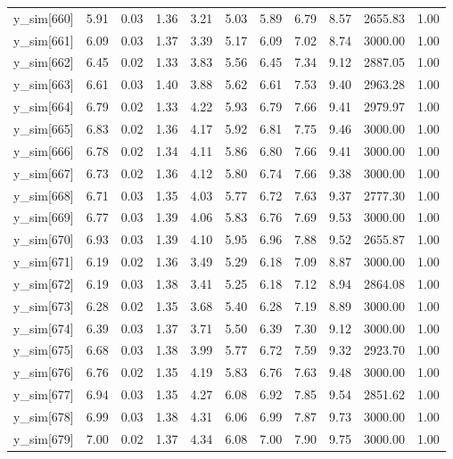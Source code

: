 \begin{table}[ht]
\begin{tabular}{rrrrrrrrrrr}
  y\_sim[660] & 5.91 & 0.03 & 1.36 & 3.21 & 5.03 & 5.89 & 6.79 & 8.57 & 2655.83 & 1.00 \\ 
  y\_sim[661] & 6.09 & 0.03 & 1.37 & 3.39 & 5.17 & 6.09 & 7.02 & 8.74 & 3000.00 & 1.00 \\ 
  y\_sim[662] & 6.45 & 0.02 & 1.33 & 3.83 & 5.56 & 6.45 & 7.34 & 9.12 & 2887.05 & 1.00 \\ 
  y\_sim[663] & 6.61 & 0.03 & 1.40 & 3.88 & 5.62 & 6.61 & 7.53 & 9.40 & 2963.28 & 1.00 \\ 
  y\_sim[664] & 6.79 & 0.02 & 1.33 & 4.22 & 5.93 & 6.79 & 7.66 & 9.41 & 2979.97 & 1.00 \\ 
  y\_sim[665] & 6.83 & 0.02 & 1.36 & 4.17 & 5.92 & 6.81 & 7.75 & 9.46 & 3000.00 & 1.00 \\ 
  y\_sim[666] & 6.78 & 0.02 & 1.34 & 4.11 & 5.86 & 6.80 & 7.66 & 9.41 & 3000.00 & 1.00 \\ 
  y\_sim[667] & 6.73 & 0.02 & 1.36 & 4.12 & 5.80 & 6.74 & 7.66 & 9.38 & 3000.00 & 1.00 \\ 
  y\_sim[668] & 6.71 & 0.03 & 1.35 & 4.03 & 5.77 & 6.72 & 7.63 & 9.37 & 2777.30 & 1.00 \\ 
  y\_sim[669] & 6.77 & 0.03 & 1.39 & 4.06 & 5.83 & 6.76 & 7.69 & 9.53 & 3000.00 & 1.00 \\ 
  y\_sim[670] & 6.93 & 0.03 & 1.39 & 4.10 & 5.95 & 6.96 & 7.88 & 9.52 & 2655.87 & 1.00 \\ 
  y\_sim[671] & 6.19 & 0.02 & 1.36 & 3.49 & 5.29 & 6.18 & 7.09 & 8.87 & 3000.00 & 1.00 \\ 
  y\_sim[672] & 6.19 & 0.03 & 1.38 & 3.41 & 5.25 & 6.18 & 7.12 & 8.94 & 2864.08 & 1.00 \\ 
  y\_sim[673] & 6.28 & 0.02 & 1.35 & 3.68 & 5.40 & 6.28 & 7.19 & 8.89 & 3000.00 & 1.00 \\ 
  y\_sim[674] & 6.39 & 0.03 & 1.37 & 3.71 & 5.50 & 6.39 & 7.30 & 9.12 & 3000.00 & 1.00 \\ 
  y\_sim[675] & 6.68 & 0.03 & 1.38 & 3.99 & 5.77 & 6.72 & 7.59 & 9.32 & 2923.70 & 1.00 \\ 
  y\_sim[676] & 6.76 & 0.02 & 1.35 & 4.19 & 5.83 & 6.76 & 7.63 & 9.48 & 3000.00 & 1.00 \\ 
  y\_sim[677] & 6.94 & 0.03 & 1.35 & 4.27 & 6.08 & 6.92 & 7.85 & 9.54 & 2851.62 & 1.00 \\ 
  y\_sim[678] & 6.99 & 0.03 & 1.38 & 4.31 & 6.06 & 6.99 & 7.87 & 9.73 & 3000.00 & 1.00 \\ 
  y\_sim[679] & 7.00 & 0.02 & 1.37 & 4.34 & 6.08 & 7.00 & 7.90 & 9.75 & 3000.00 & 1.00 \\ 

\end{tabular}
\end{table}
